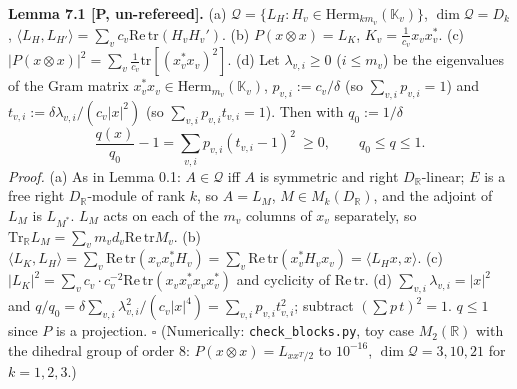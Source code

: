 \textbf{Lemma 7.1 {[}P, un-refereed{]}.} (a) \(\mathcal Q=\{L_H:H_v\in\mathrm{Herm}_{km_v}(\mathbb K_v)\}\), \(\dim\mathcal Q=D_k\), \(\langle L_H,L_{H'}\rangle=\sum_vc_v\mathrm{Re\,tr}(H_vH_v')\). (b) \(P(x\otimes x)=L_K\), \(K_v=\frac1{c_v}x_vx_v^*\). (c) \(|P(x\otimes x)|^2=\sum_v\frac1{c_v}\mathrm{tr}[(x_v^*x_v)^2]\). (d) Let \(\lambda_{v,i}\ge0\) (\(i\le m_v\)) be the eigenvalues of the Gram matrix \(x_v^*x_v\in\mathrm{Herm}_{m_v}(\mathbb K_v)\), \(p_{v,i}:=c_v/\delta\) (so \(\sum_{v,i}p_{v,i}=1\)) and \(t_{v,i}:=\delta\lambda_{v,i}/(c_v|x|^2)\) (so \(\sum_{v,i}p_{v,i}t_{v,i}=1\)). Then with \(q_0:=1/\delta\)
\[\frac{q(x)}{q_0}-1=\sum_{v,i}p_{v,i}(t_{v,i}-1)^2\ \ge0,\qquad q_0\le q\le1 .\]
\emph{Proof.} (a) As in Lemma 0.1: \(A\in\mathcal Q\) iff \(A\) is symmetric and right \(D_\mathbb R\)-linear; \(E\) is a free right \(D_\mathbb R\)-module of rank \(k\), so \(A=L_M\), \(M\in M_k(D_\mathbb R)\), and the adjoint of \(L_M\) is \(L_{M^*}\). \(L_M\) acts on each of the \(m_v\) columns of \(x_v\) separately, so \(\mathrm{Tr}_\mathbb RL_M=\sum_vm_vd_v\mathrm{Re\,tr}M_v\). (b) \(\langle L_K,L_H\rangle=\sum_v\mathrm{Re\,tr}(x_vx_v^*H_v)=\sum_v\mathrm{Re\,tr}(x_v^*H_vx_v)=\langle L_Hx,x\rangle\). (c) \(|L_K|^2=\sum_vc_v\cdot c_v^{-2}\mathrm{Re\,tr}(x_vx_v^*x_vx_v^*)\) and cyclicity of \(\mathrm{Re\,tr}\). (d) \(\sum_{v,i}\lambda_{v,i}=|x|^2\) and \(q/q_0=\delta\sum_{v,i}\lambda_{v,i}^2/(c_v|x|^4)=\sum_{v,i}p_{v,i}t_{v,i}^2\); subtract \((\sum p\,t)^2=1\). \(q\le1\) since \(P\) is a projection. \(\square\) (Numerically: \texttt{check\_blocks.py}, toy case \(M_2(\mathbb R)\) with the dihedral group of order 8: \(P(x\otimes x)=L_{xx^T/2}\) to \(10^{-16}\), \(\dim\mathcal Q=3,10,21\) for \(k=1,2,3\).)

